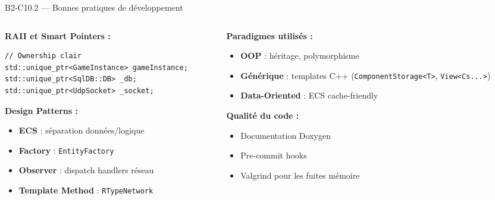 \documentclass[aspectratio=169,10pt]{beamer}
\begin{document}
\begin{frame}[fragile]{B2-C10.2 — Bonnes pratiques de développement}
\footnotesize

\begin{columns}[T]
\begin{column}{0.48\textwidth}
\textbf{RAII et Smart Pointers :}
\begin{lstlisting}
// Ownership clair
std::unique_ptr<GameInstance> gameInstance;
std::unique_ptr<SqlDB::DB> _db;
std::unique_ptr<UdpSocket> _socket;
\end{lstlisting}

\textbf{Design Patterns :}
\begin{itemize}\setlength\itemsep{1pt}
  \item \textbf{ECS} : séparation données/logique
  \item \textbf{Factory} : \texttt{EntityFactory}
  \item \textbf{Observer} : dispatch handlers réseau
  \item \textbf{Template Method} : \texttt{RTypeNetwork}
\end{itemize}
\end{column}

\begin{column}{0.48\textwidth}
\textbf{Paradigmes utilisés :}
\begin{itemize}\setlength\itemsep{1pt}
  \item \textbf{OOP} : héritage, polymorphisme
  \item \textbf{Générique} : templates C++ (\texttt{ComponentStorage<T>}, \texttt{View<Cs...>})
  \item \textbf{Data-Oriented} : ECS cache-friendly
\end{itemize}

\vspace{0.2em}
\textbf{Qualité du code :}
\begin{itemize}\setlength\itemsep{1pt}
  \item Documentation Doxygen
  \item Pre-commit hooks
  \item Valgrind pour les fuites mémoire
\end{itemize}
\end{column}
\end{columns}
\end{frame}
\end{document}
